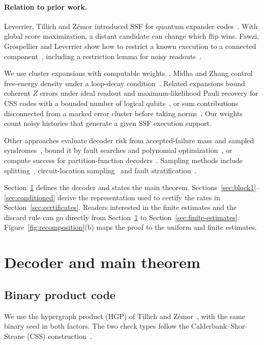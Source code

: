 \documentclass[10pt,twocolumn]{article}
\theoremstyle{definition}
\begin{document}
\paragraph{Relation to prior work.}
Leverrier, Tillich and Z\'emor introduced SSF for quantum expander
codes~\cite{LTZ15}. With global score maximization, a distant
candidate can change which flip wins. Fawzi, Grospellier and
Leverrier show how to restrict a known execution to a connected
component~\cite[Prop.~12 and Lemma~21]{FGL17}, including a
restriction lemma for noisy readouts~\cite[Lemma~19]{FGL18}.

We use cluster expansions with computable
weights~\cite{KP86,HPR20,MW25}. Midha and Zhang control free-energy
density under a loop-decay condition~\cite{MZ26}. Related expansions
bound coherent $Z$ errors under ideal readout and maximum-likelihood
Pauli recovery for CSS codes with a bounded number of logical
qubits~\cite{TK26}, or sum contributions disconnected from a
marked error cluster before taking norms~\cite{Han26}. Our weights
count noisy histories that generate a given SSF execution support.

Other approaches evaluate decoder risk from accepted-failure mass and
sampled syndromes~\cite{CP26}, bound it by fault searches and polynomial
optimization~\cite{MSA26}, or compute success for partition-function
decoders~\cite{WHMG26}. Sampling methods include splitting~\cite{BV13,BCCY25},
circuit-location sampling~\cite{Mayer26} and fault stratification~\cite{HWRM24}.

Section~\ref{sec:setting} defines the decoder and states the main
theorem. Sections~\ref{sec:block1}--\ref{sec:conditioned} derive the
representation used to certify the rates in Section~\ref{sec:certificates}.
Readers interested in the finite estimates and the discard rule
can go directly from Section~\ref{sec:setting} to
Section~\ref{sec:finite-estimates}. Figure~\ref{fig:recomposition}(b)
maps the proof to the uniform and finite estimates.

\section{Decoder and main theorem}\label{sec:setting}

\subsection{Binary product code}
We use the hypergraph product (HGP) of Tillich and
Z\'emor~\cite{TZ14}, with the same binary seed in both factors.
The two check types follow the Calderbank--Shor--Steane (CSS)
construction~\cite{CS96,Steane96}.
\end{document}
